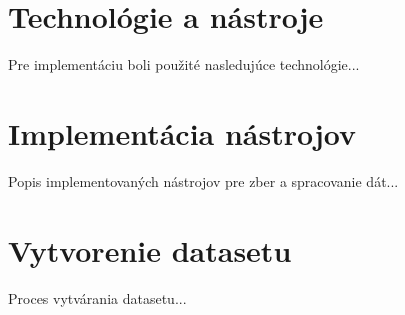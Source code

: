 \section{Technológie a nástroje}

Pre implementáciu boli použité nasledujúce technológie...

\section{Implementácia nástrojov}

Popis implementovaných nástrojov pre zber a spracovanie dát...

\section{Vytvorenie datasetu}

Proces vytvárania datasetu...
